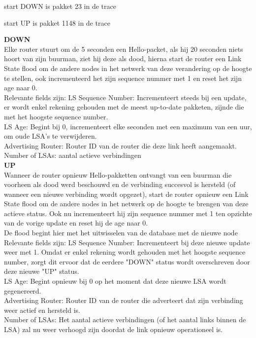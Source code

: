start DOWN is pakket 23 in de trace

start UP is pakket 1148 in de trace


\textbf{DOWN}\\
Elke router stuurt om de 5 seconden een Hello-packet, als hij 20 seconden niets hoort van zijn buurman, ziet hij deze als dood, hierna start de router een Link State flood om de andere nodes in het netwerk van deze verandering op de hoogte te stellen, ook incrementeerd het zijn sequence nummer met 1 en reset het zijn age naar 0.\\
Relevante fields zijn:
LS Sequence Number: Incrementeert steeds bij een update, er wordt enkel rekening gehouden met de meest up-to-date pakketen, zijnde die met het hoogste sequence number.\\
LS Age: Begint bij 0, incrementeert elke seconden met een maximum van een uur, om oude LSA's te verwijderen.\\
Advertising Router: Router ID van de router die deze link heeft aangemaakt.\\
Number of LSAs: aantal actieve verbindingen\\

\textbf{UP}\\
Wanneer de router opnieuw Hello-pakketten ontvangt van een buurman die voorheen als dood werd beschouwd en de verbinding succesvol is hersteld (of wanneer een nieuwe verbinding wordt opgezet), start de router opnieuw een Link State flood om de andere nodes in het netwerk op de hoogte te brengen van deze actieve status. Ook nu incrementeert hij zijn sequence nummer met 1 ten opzichte van de vorige update en reset hij de age naar 0.\\
De flood begint hier met het uitwisselen van de database met de nieuwe node
Relevante fields zijn:
LS Sequence Number: Incrementeert bij deze nieuwe update weer met 1. Omdat er enkel rekening wordt gehouden met het hoogste sequence number, zorgt dit ervoor dat de eerdere "DOWN" status wordt overschreven door deze nieuwe "UP" status.\\
LS Age: Begint opnieuw bij 0 op het moment dat deze nieuwe LSA wordt gegenereerd.\\
Advertising Router: Router ID van de router die adverteert dat zijn verbinding weer actief en hersteld is.\\
Number of LSAs: Het aantal actieve verbindingen (of het aantal links binnen de LSA) zal nu weer verhoogd zijn doordat de link opnieuw operationeel is.\\

